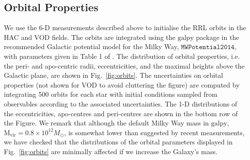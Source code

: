 \documentclass[a4paper,useAMS,usenatbib]{mnras}
\begin{document}
\subsection{Orbital Properties}

We use the 6-D measurements described above to initialise the RRL
orbits in the HAC and VOD fields. The orbits are integrated using the
$\mathrm{galpy}$ package \citep{Bovy2015} in the recommended Galactic
potential model for the Milky Way, $\texttt{MWPotential2014}$, with
parameters given in Table 1 of \citet{Bovy2015}. The distribution of 
orbital
properties, i.e. the peri- and apo-centric radii, eccentricities, and
the maximal heights above the Galactic plane, are shown in
Fig.~\ref{fig:orbits}. The uncertainties on orbital properties
(not shown for VOD to avoid cluttering the figure) are computed by 
integrating 500 orbits for each star with 
initial conditions sampled from observables according to
the associated uncertainties. The 1-D distributions of the
eccentricities, apo-centres and peri-centres are shown in the bottom
row of the Figure.  We remark that although the default Milky Way mass in
$\mathrm{galpy}$, $\mathrm{M_{vir}} = 0.8 \times 10^{12} M_{\odot}$,
is somewhat lower than suggested by recent measurements, we have
checked that the distributions of the orbital parameters
displayed in Fig.~\ref{fig:orbits} are minimally affected if we
increase the Galaxy's mass.
\end{document}
